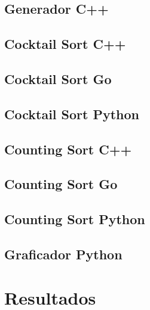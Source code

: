 \documentclass[https://www.overleaf.com/project/63761df255a8a9f4a15c3579
	letterpaper, %
	10pt, %
]{CSUniSchoolLabReport}
\begin{document}
\subsection{Generador C++}


\subsection{Cocktail Sort C++}


\subsection{Cocktail Sort Go}


\subsection{Cocktail Sort Python}


\subsection{Counting Sort C++}


\subsection{Counting Sort Go}


\subsection{Counting Sort Python}


\subsection{Graficador Python}



\section{Resultados}
\end{document}
